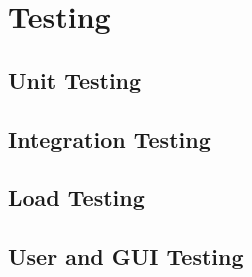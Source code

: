 \section{Testing}

\subsection{Unit Testing}
\subsection{Integration Testing}
\subsection{Load Testing}
\subsection{User and GUI Testing}
